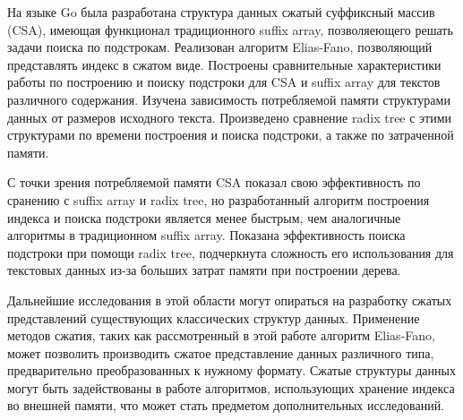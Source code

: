 
На языке Go была разработана структура данных сжатый суффиксный массив (CSA), имеющая
функционал традиционного suffix array, позволяеющего решать задачи поиска по подстрокам.
Реализован алгоритм Elias-Fano, позволяющий представлять индекс в сжатом виде.
Построены сравнительные характеристики работы по построению и поиску подстроки
для CSA и suffix array для текстов различного содержания.
Изучена зависимость потребляемой памяти структурами данных от размеров исходного текста.
Произведено сравнение radix tree с этими структурами по времени построения и поиска подстроки,
а также по затраченной памяти.

С точки зрения потребляемой памяти CSA показал свою эффективность по сранению с suffix array и radix tree,
но разработанный алгоритм построения индекса и поиска подстроки является менее быстрым,
чем аналогичные алгоритмы в традиционном suffix array. Показана эффективность поиска подстроки
при помощи radix tree, подчеркнута сложность его использования для текстовых данных из-за больших
затрат памяти при построении дерева.

Дальнейшие исследования в этой области могут опираться на разработку сжатых представлений существующих
классических структур данных. Применение методов сжатия,
таких как рассмотренный в этой работе алгоритм Elias-Fano, может позволить производить сжатое представление
данных различного типа, предварительно преобразованных к нужному формату.
Сжатые структуры данных могут быть задействованы в работе алгоритмов,
использующих хранение индекса во внешней памяти, что может стать предметом дополнительных исследований.
